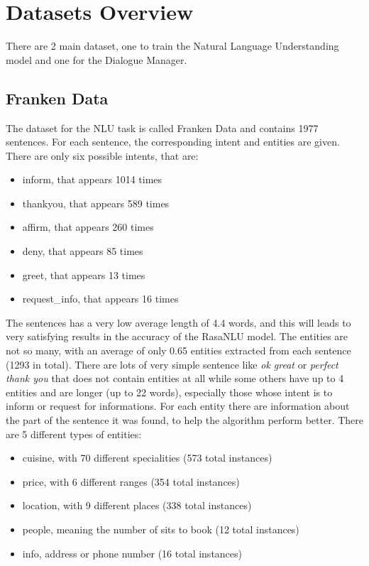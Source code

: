 \documentclass[11pt,a4paper]{article}
\begin{document}
\section{Datasets Overview}

There are 2 main dataset, one to train the Natural Language Understanding model and one for the Dialogue Manager.

\subsection{Franken Data}

The dataset for the NLU task is called Franken Data and contains 1977 sentences. For each sentence, the corresponding intent and entities are given. There are only six possible intents, that are: 

\begin{itemize}
\item inform, that appears 1014 times
\item thankyou, that appears 589 times
\item affirm, that appears 260 times
\item deny, that appears 85 times
\item greet, that appears 13 times
\item request\_info, that appears 16 times
\end{itemize}

The sentences has a very low average length of 4.4 words, and this will leads to very satisfying results in the accuracy of the RasaNLU model.
The entities are not so many, with an average of only 0.65 entities extracted from each sentence (1293 in total). There are lots of very simple sentence like \textit{ok great} or \textit{perfect thank you} that does not contain entities at all while some others have up to 4 entities and are longer (up to 22 words), especially those whose intent is to inform or request for informations. For each entity there are information about the part of the sentence it was found, to help the algorithm perform better. There are 5 different types of entities:

\begin{itemize}
\item cuisine, with 70 different specialities (573 total instances)
\item price, with 6 different ranges (354 total instances)
\item location, with 9 different places (338 total instances)
\item people, meaning the number of sits to book (12 total instances)
\item info, address or phone number (16 total instances)
\end{itemize}
\end{document}

